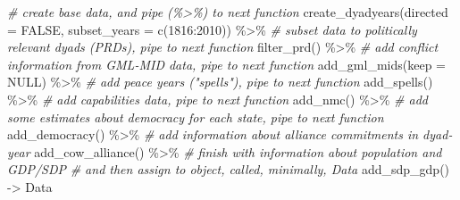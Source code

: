 \documentclass[
  11pt,
]{article}
\newenvironment{Shaded}{\begin{snugshade}}{\end{snugshade}}
\newcommand{\AttributeTok}[1]{\textcolor[rgb]{0.77,0.63,0.00}{#1}}
\newcommand{\CommentTok}[1]{\textcolor[rgb]{0.56,0.35,0.01}{\textit{#1}}}
\newcommand{\ConstantTok}[1]{\textcolor[rgb]{0.00,0.00,0.00}{#1}}
\newcommand{\DecValTok}[1]{\textcolor[rgb]{0.00,0.00,0.81}{#1}}
\newcommand{\FunctionTok}[1]{\textcolor[rgb]{0.00,0.00,0.00}{#1}}
\newcommand{\NormalTok}[1]{#1}
\newcommand{\OtherTok}[1]{\textcolor[rgb]{0.56,0.35,0.01}{#1}}
\newcommand{\SpecialCharTok}[1]{\textcolor[rgb]{0.00,0.00,0.00}{#1}}
\begin{document}
\begin{Shaded}
\begin{Highlighting}[]
\CommentTok{\# create base data, and pipe (\%\textgreater{}\%) to next function}
\FunctionTok{create\_dyadyears}\NormalTok{(}\AttributeTok{directed =} \ConstantTok{FALSE}\NormalTok{, }\AttributeTok{subset\_years =} \FunctionTok{c}\NormalTok{(}\DecValTok{1816}\SpecialCharTok{:}\DecValTok{2010}\NormalTok{)) }\SpecialCharTok{\%\textgreater{}\%}
  \CommentTok{\# subset data to politically relevant dyads (PRDs), pipe to next function}
  \FunctionTok{filter\_prd}\NormalTok{() }\SpecialCharTok{\%\textgreater{}\%}
  \CommentTok{\# add conflict information from GML{-}MID data, pipe to next function}
  \FunctionTok{add\_gml\_mids}\NormalTok{(}\AttributeTok{keep =} \ConstantTok{NULL}\NormalTok{) }\SpecialCharTok{\%\textgreater{}\%}
  \CommentTok{\# add peace years ("spells"), pipe to next function}
  \FunctionTok{add\_spells}\NormalTok{() }\SpecialCharTok{\%\textgreater{}\%}
  \CommentTok{\# add capabilities data, pipe to next function}
  \FunctionTok{add\_nmc}\NormalTok{() }\SpecialCharTok{\%\textgreater{}\%}
  \CommentTok{\# add some estimates about democracy for each state, pipe to next function}
  \FunctionTok{add\_democracy}\NormalTok{() }\SpecialCharTok{\%\textgreater{}\%}
  \CommentTok{\# add information about alliance commitments in dyad{-}year}
  \FunctionTok{add\_cow\_alliance}\NormalTok{() }\SpecialCharTok{\%\textgreater{}\%}
  \CommentTok{\# finish with information about population and GDP/SDP}
  \CommentTok{\# and then assign to object, called, minimally, \textquotesingle{}Data\textquotesingle{}}
  \FunctionTok{add\_sdp\_gdp}\NormalTok{() }\OtherTok{{-}\textgreater{}}\NormalTok{ Data}


\end{Highlighting}
\end{Shaded}
\end{document}
